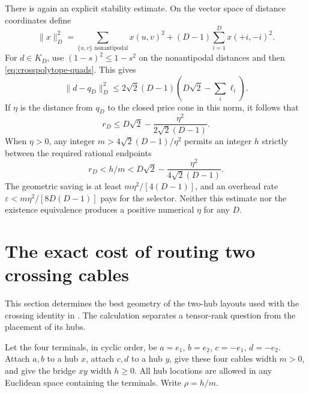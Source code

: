 There is again an explicit stability estimate. On the vector space of distance coordinates define
\[
 \|x\|_D^2=
 \sum_{\{u,v\}\text{ nonantipodal}}x(u,v)^2
 +(D-1)\sum_{i=1}^Dx(+i,-i)^2.
\]
For $d\in K_D$, use $(1-s)^2\leq1-s^2$ on the nonantipodal distances and then \eqref{eq:crosspolytope-quads}. This gives
\[
 \|d-q_D\|_D^2\leq
 2\sqrt2(D-1)\left(D\sqrt2-\sum_i\ell_i\right).
\]
If $\eta$ is the distance from $q_D$ to the closed price cone in this norm, it follows that
\[
 r_D\leq D\sqrt2-\frac{\eta^2}{2\sqrt2(D-1)}.
\]
When $\eta>0$, any integer $m>4\sqrt2(D-1)/\eta^2$ permits an integer $h$ strictly between the required rational endpoints
\[
 r_D<h/m<D\sqrt2-\frac{\eta^2}{4\sqrt2(D-1)}.
\]
The geometric saving is at least $m\eta^2/[4(D-1)]$, and an overhead rate $\varepsilon<m\eta^2/[8D(D-1)]$ pays for the selector. Neither this estimate nor the existence equivalence produces a positive numerical $\eta$ for any $D$.

\section{The exact cost of routing two crossing cables}\label{sec:two-hub-cost}
This section determines the best geometry of the two-hub layouts used with the crossing identity in \cite[Appendix B]{Anthropic2026}. The calculation separates a tensor-rank question from the placement of its hubs.

Let the four terminals, in cyclic order, be $a=e_1$, $b=e_2$, $c=-e_1$, $d=-e_2$. Attach $a,b$ to a hub $x$, attach $c,d$ to a hub $y$, give these four cables width $m>0$, and give the bridge $xy$ width $h\geq0$. All hub locations are allowed in any Euclidean space containing the terminals. Write $\rho=h/m$.

